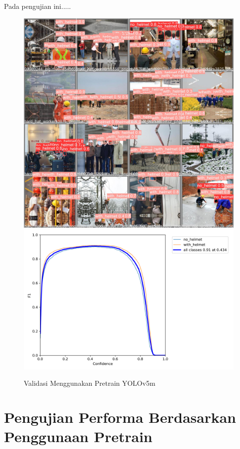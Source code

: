 Pada pengujian ini.....

\begin{figure}[ht]
  \centering
  \includegraphics[scale=0.1]{gambar/train_v2_val/HelmetDetection_yolov5m/val_batch0_pred.jpg}
  \includegraphics[scale=0.3]{gambar/train_v2_val/HelmetDetection_yolov5m/F1_curve.png}
  \caption{Validasi Menggunakan Pretrain YOLOv5m}
  \label{fig:valyolov5m}  
\end{figure}

\section{Pengujian Performa Berdasarkan Penggunaan Pretrain}
\label{sec:pengujianantarpretrain}

